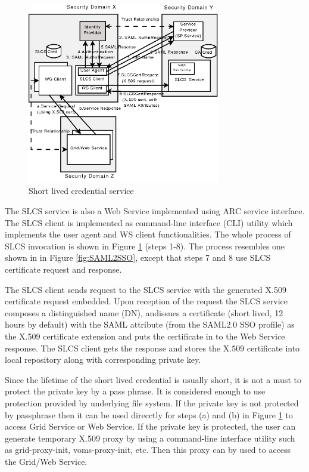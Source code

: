 \documentclass[twocolumn]{svjour3}         %
\begin{document}
\begin{figure}
\includegraphics[width=0.75\textwidth]{SLCS.png}
\caption{Short lived credential service}
\label{fig:SLCS}
\end{figure}
The SLCS service is also a Web Service implemented using ARC service interface. The SLCS client is implemented as command-line interface (CLI) utility which implements the user agent and WS client functionalities. The whole process of SLCS invocation is shown in Figure \ref{fig:SLCS} (steps 1‑8). The process resembles one shown in in Figure \ref{fig:SAML2SSO}, except that steps 7 and 8 use SLCS certificate request and response.

The SLCS client sends request to the SLCS service with the generated X.509 certificate request embedded. Upon reception of the request the SLCS service  composes a distinguished name (DN), andissues a certificate (short lived, 12 hours by default) with the SAML attribute (from the SAML2.0 SSO profile) as the X.509 certificate extension and puts the certificate in to the Web Service response. The SLCS client gets the response and stores the X.509 certificate into local repository along with corresponding private key.

Since the lifetime of the short lived credential is usually short, it is not a must to protect the private key by a pass phrase. It is considered enough to use protection  provided by underlying file system. If the private key is not protected by passphrase then it can be used direcctly for steps (a) and (b) in Figure \ref{fig:SLCS} to access Grid Service or Web Service. If the private key is protected, the user can generate temporary  X.509 proxy by using a command-line interface utility such as grid-proxy-init, voms-proxy-init, etc. Then this proxy can by used  to access the Grid/Web Service.
\end{document}
